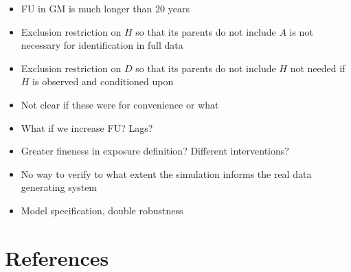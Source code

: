 \documentclass[
  11pt,
]{article}
\providecommand{\tightlist}{%
  \setlength{\itemsep}{0pt}\setlength{\parskip}{0pt}}
\begin{document}
\begin{itemize}
\tightlist
\item
  FU in GM is much longer than 20 years
\item
  Exclusion restriction on \(H\) so that its parents do not include
  \(A\) is not necessary for identification in full data
\item
  Exclusion restriction on \(D\) so that its parents do not include
  \(H\) not needed if \(H\) is observed and conditioned upon
\item
  Not clear if these were for convenience or what
\item
  What if we increase FU? Lags?
\item
  Greater fineness in exposure definition? Different interventions?
\item
  No way to verify to what extent the simulation informs the real data
  generating system
\item
  Model specification, double robustness
\end{itemize}

\newpage

\hypertarget{references}{%
\section*{References}\label{references}}
\end{document}
